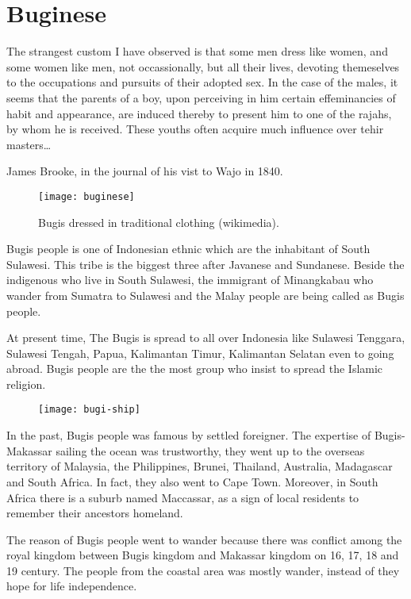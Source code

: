 \newfontfamily{}

\section{Buginese}
\label{s:buginese}

\epigraph{The strangest custom I have observed is that some men dress like women, and some women like men, not occassionally, 
but all their lives, devoting themeselves to the occupations and pursuits of their adopted sex. In the case of the males, it seems that the parents of a boy, upon perceiving in him certain effeminancies of habit and appearance, are induced thereby to present him to one of the rajahs, by whom he is received. These youths often acquire much influence over tehir masters\ldots}{James Brooke, in the journal of his vist to Wajo in 1840. }

\begin{figure}[htbp]
\texttt{[image: buginese]}
\caption{Bugis dressed in traditional clothing (wikimedia).}
\end{figure}

Bugis people is one of Indonesian ethnic which are the inhabitant of South Sulawesi. This tribe is the biggest three after Javanese and Sundanese. Beside the indigenous who live in South Sulawesi, the immigrant of Minangkabau who wander from Sumatra to Sulawesi and the Malay people are being called as Bugis people.

At present time, The Bugis is spread to all over Indonesia like Sulawesi Tenggara, Sulawesi Tengah, Papua, Kalimantan Timur, Kalimantan Selatan even to going abroad. Bugis people are the the most group who insist to spread the Islamic religion.

\begin{figure}[htbp]
\texttt{[image: bugi-ship]}
\end{figure}

In the past, Bugis people was famous by settled foreigner. The expertise of Bugis-Makassar sailing the ocean was trustworthy, they went up to the overseas territory of Malaysia, the Philippines, Brunei, Thailand, Australia, Madagascar and South Africa. In fact, they also went to Cape Town. Moreover, in South Africa there is a suburb named Maccassar, as a sign of local residents to remember their ancestors homeland.

The reason of Bugis people went to wander because there was conflict among the royal kingdom between Bugis kingdom and Makassar kingdom on 16, 17, 18 and 19 century. The people from the coastal area was mostly wander, instead of they hope for life independence.

